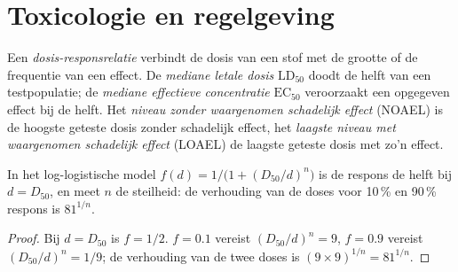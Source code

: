 \section{Toxicologie en regelgeving}

\begin{definition}\label{def:b3:environmental-toxicology:dose}
Een \emph{dosis-responsrelatie} verbindt de
dosis van een stof met de grootte of de frequentie van een effect. De
\emph{mediane letale dosis} $\mathrm{LD_{50}}$ doodt de helft van een testpopulatie; de
\emph{mediane effectieve concentratie} $\mathrm{EC_{50}}$
veroorzaakt een opgegeven effect bij de helft. Het
\emph{niveau zonder waargenomen schadelijk
effect} (NOAEL) is de
hoogste geteste dosis zonder schadelijk effect, het
\emph{laagste niveau met waargenomen schadelijk
effect} (LOAEL) de
laagste geteste dosis met zo'n effect.
\end{definition}

\begin{proposition}\label{prop:b3:environmental-toxicology:dose-response}
In het log-logistische model $f(d) = 1/\bigl(1 + (D_{50}/d)^n\bigr)$ is de respons de helft bij $d = D_{50}$, en meet $n$
de steilheid: de verhouding van de doses voor 10\,\% en 90\,\% respons is $81^{1/n}$.
\end{proposition}

\begin{proof}
Bij $d = D_{50}$ is $f = 1/2$. $f = 0.1$ vereist $(D_{50}/d)^n = 9$, $f = 0.9$ vereist $(D_{50}/d)^n = 1/9$; de verhouding van de twee doses
is $(9 \times 9)^{1/n} = 81^{1/n}$.
\end{proof}

